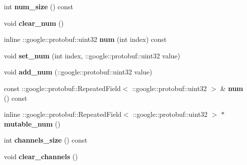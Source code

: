 \begin{DoxyCompactItemize}
\item 
\mbox{\label{classcaffe_1_1_dummy_data_parameter_ad8e0a996ea7cb3568ed051cb5d728dc8}} 
int {\bfseries num\+\_\+size} () const
\item 
\mbox{\label{classcaffe_1_1_dummy_data_parameter_add9f8110385e40ee540fe125cf832d35}} 
void {\bfseries clear\+\_\+num} ()
\item 
\mbox{\label{classcaffe_1_1_dummy_data_parameter_a529bf7ed2bcf87fae5fafc9d93b76242}} 
inline \+::google\+::protobuf\+::uint32 {\bfseries num} (int index) const
\item 
\mbox{\label{classcaffe_1_1_dummy_data_parameter_add477fb4d96403bd5a9e7662c968a71a}} 
void {\bfseries set\+\_\+num} (int index, \+::google\+::protobuf\+::uint32 value)
\item 
\mbox{\label{classcaffe_1_1_dummy_data_parameter_a563475c5350c3fed16ab22bf9bb9d228}} 
void {\bfseries add\+\_\+num} (\+::google\+::protobuf\+::uint32 value)
\item 
\mbox{\label{classcaffe_1_1_dummy_data_parameter_aa3f3dcdc099b68465f7765f228f7346d}} 
const \+::google\+::protobuf\+::\+Repeated\+Field$<$ \+::google\+::protobuf\+::uint32 $>$ \& {\bfseries num} () const
\item 
\mbox{\label{classcaffe_1_1_dummy_data_parameter_a2250b9617cf1d6eb8f9edc9cff171b08}} 
inline \+::google\+::protobuf\+::\+Repeated\+Field$<$ \+::google\+::protobuf\+::uint32 $>$ $\ast$ {\bfseries mutable\+\_\+num} ()
\item 
\mbox{\label{classcaffe_1_1_dummy_data_parameter_a259f5a1024d45c4fde3721f116e4d477}} 
int {\bfseries channels\+\_\+size} () const
\item 
\mbox{\label{classcaffe_1_1_dummy_data_parameter_ad962eac371440f64d11ad1626152eac8}} 
void {\bfseries clear\+\_\+channels} ()
\item 

\end{DoxyCompactItemize}
